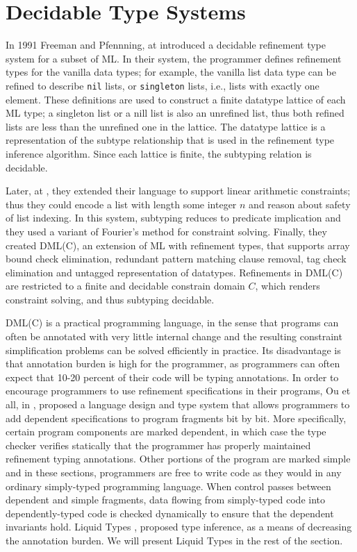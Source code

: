 	\newcommand\qset{\ensuremath{\mathbb{Q}}}
\newcommand\NV[1]{\columnbreak}


\section{Decidable Type Systems}\label{sec:liquid}
In 1991 Freeman and Pfennning, at \cite{FreemanPfenning91} introduced
a decidable refinement type system for a subset of ML.
%
In their system, the programmer defines refinement
types for the vanilla data types; 
for example, the vanilla 
list data type can be refined to 
describe \texttt{nil} lists, or \texttt{singleton} lists, i.e., lists
with exactly one element.
%
These definitions are used to 
construct a finite datatype lattice of each ML type;
a singleton list or a nill list is
also an unrefined list, thus both refined lists are 
less than the unrefined one in the lattice.
%
The datatype lattice is a representation of the subtype
relationship that is used in the 
refinement type inference algorithm. 
Since each lattice is finite, the 
subtyping relation is decidable.

Later, at \cite{pfenningxi98}, 
they extended their language to support
linear arithmetic constraints; thus they could
encode a list with length some integer $n$ and 
reason about safety of list indexing.
In this system, subtyping reduces to predicate implication
and they used a variant of Fourier's method \cite{OmegaTestCACM} 
for constraint solving.
%
Finally, they created DML(C)\cite{XiPfenning99}, 
an extension of ML with refinement types, that supports 
array bound check elimination,
redundant pattern matching clause removal, 
tag check elimination and untagged representation of datatypes.
%
Refinements in DML(C) are restricted to a finite and decidable
constrain domain $C$, 
which renders constraint solving, and thus subtyping decidable.
%

DML(C)  is a practical programming language, in the sense that 
programs can often be annotated with
very little internal change and the resulting
constraint simplification problems can be solved efficiently
in practice. 
%
Its disadvantage is that annotation burden is high for the programmer,  
as programmers can often expect that 10-20 percent of
their code will be typing annotations.
%
In order to encourage programmers to use refinement specifications in their programs,
Ou et all, in \cite{Ou2004}, proposed a language design and type system that allows programmers to add
dependent specifications to program fragments bit by bit. 
More specifically, certain program components are marked dependent, 
in which case the type checker verifies
statically that the programmer has properly maintained refinement typing annotations.
Other portions of the program are marked simple and in these sections, programmers
are free to write code as they would in any ordinary simply-typed programming language. When control passes between dependent and simple fragments, data flowing
from simply-typed code into dependently-typed code is checked dynamically to ensure that the dependent invariants hold.
Liquid Types \cite{LiquidPLDI08}, 
proposed type inference, as a means of decreasing the annotation burden.
We will present Liquid Types in the rest of the section.

